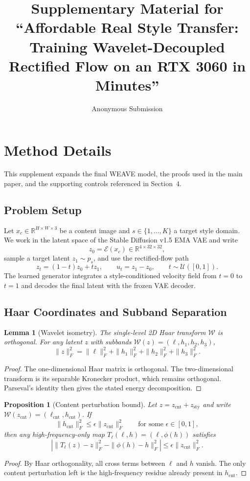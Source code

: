 \documentclass[10pt,letterpaper]{article}
\title{Supplementary Material for ``Affordable Real Style Transfer:\\
Training Wavelet-Decoupled Rectified Flow on an RTX 3060 in Minutes''}
\author{Anonymous Submission}
\date{}
\newtheorem*{slemma}{Lemma}
\newtheorem*{sproposition}{Proposition}
\begin{document}
\maketitle

\appendix

\section{Method Details}
\label{sec:method_details}

This supplement expands the final WEAVE model, the proofs used in the main paper, and the supporting controls referenced in Section~4.

\subsection{Problem Setup}
\label{sec:problem}

Let $x_c \in \mathbb{R}^{H \times W \times 3}$ be a content image and $s \in \{1,\ldots,K\}$ a target style domain. We work in the latent space of the Stable Diffusion v1.5 EMA VAE and write
\[
z_0 = \mathcal E(x_c) \in \mathbb{R}^{4 \times 32 \times 32},
\]
sample a target latent $z_1 \sim p_s$, and use the rectified-flow path
\[
z_t = (1-t)z_0 + tz_1,
\qquad
u_t = z_1 - z_0,
\qquad
t \sim \mathcal U([0,1]).
\]
The learned generator integrates a style-conditioned velocity field from $t=0$ to $t=1$ and decodes the final latent with the frozen VAE decoder.

\subsection{Haar Coordinates and Subband Separation}
\label{sec:haar}

\begin{slemma}[Wavelet isometry]
The single-level 2D Haar transform $\mathcal W$ is orthogonal. For any latent $z$ with subbands $\mathcal W(z) = (\ell,h_1,h_2,h_3)$,
\[
\|z\|_F^2 = \|\ell\|_F^2 + \|h_1\|_F^2 + \|h_2\|_F^2 + \|h_3\|_F^2.
\]
\end{slemma}
\begin{proof}
The one-dimensional Haar matrix is orthogonal. The two-dimensional transform is its separable Kronecker product, which remains orthogonal. Parseval's identity then gives the stated energy decomposition.
\end{proof}

\begin{sproposition}[Content perturbation bound]
Let $z=z_{\mathrm{cnt}}+z_{\mathrm{sty}}$ and write $\mathcal W(z_{\mathrm{cnt}})=(\ell_{\mathrm{cnt}},h_{\mathrm{cnt}})$. If
\[
\|h_{\mathrm{cnt}}\|_F^2 \le \epsilon \|z_{\mathrm{cnt}}\|_F^2
\qquad
\text{for some } \epsilon\in[0,1],
\]
then any high-frequency-only map $T_\ell(\ell,h)=(\ell,\phi(h))$ satisfies
\[
\left|
\|T_\ell(z)-z\|_F^2 - \|\phi(h)-h\|_F^2
\right|
\le \epsilon \|z_{\mathrm{cnt}}\|_F^2.
\]
\end{sproposition}
\begin{proof}
By Haar orthogonality, all cross terms between $\ell$ and $h$ vanish. The only content perturbation left is the high-frequency residue already present in $h_{\mathrm{cnt}}$.
\end{proof}
\end{document}
